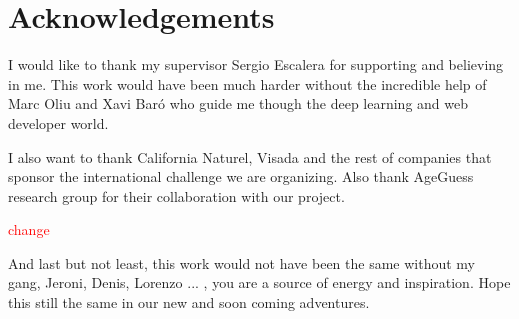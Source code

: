 \documentclass[11pt, oneside]{book}
\newcommand\note[1]{\textcolor{red}{#1}}
\begin{document}
\setcounter{page}{3}


\chapter*{} %
\thispagestyle{empty}

\thispagestyle{empty}
\chapter*{Acknowledgements}
\thispagestyle{empty}

I would like to thank my supervisor Sergio Escalera for supporting and believing in me. This work would have been much harder without the incredible help of Marc Oliu and Xavi Baró who guide me though the deep learning and web developer world.

I also want to thank California Naturel, Visada and the rest of companies that sponsor the international challenge we are organizing. Also thank AgeGuess research group for their collaboration with our project.

\note{change} 

And last but not least, this work would not have been the same without my gang, Jeroni, Denis, Lorenzo ... , you are a source of energy and inspiration. Hope this still the same in our new and soon coming adventures.

\setcounter{page}{0}
\clearpage

\newpage
{} %

\newpage
\tableofcontents

\newpage
\listoftables

\newpage
\listoffigures

\newpage
{} %









\renewcommand{\bibname}{\refname} %
\addcontentsline{toc}{chapter}{\bibname}



\glsaddall
\printglossaries


\end{document}
